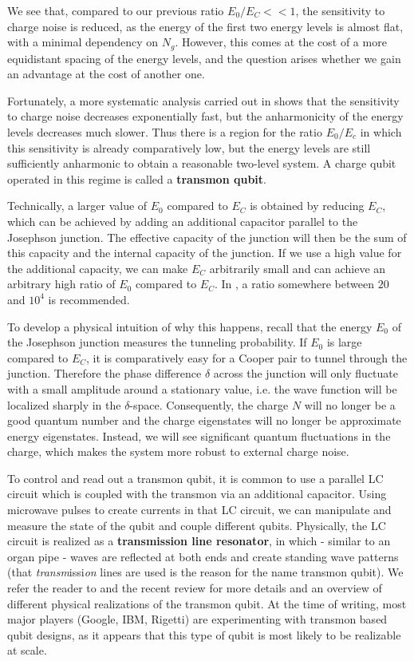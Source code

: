 \documentclass[a4paper, draft]{article}
\theoremstyle{own}
\theoremstyle{remark}
\begin{document}
We see that, compared to our previous ratio $E_0 / E_C << 1$, the sensitivity to charge noise is reduced, as the energy of the first two energy levels is almost flat, with a minimal dependency on $N_g$. However, this comes at the cost of a more equidistant spacing of the energy levels, and the question arises whether we gain an advantage at the cost of another one.

Fortunately, a more systematic analysis carried out in \cite{KochEtAl} shows that the sensitivity to charge noise decreases exponentially fast, but the anharmonicity of the energy levels decreases much slower. Thus there is a region for the ratio $E_0 / E_c$ in which this sensitivity is already comparatively low, but the energy levels are still sufficiently anharmonic to obtain a reasonable two-level system. A charge qubit operated in this regime is called a {\bf transmon qubit}.

Technically, a larger value of $E_0$ compared to $E_C$ is obtained by reducing $E_C$, which can be achieved by adding an additional capacitor parallel to the Josephson junction. The effective capacity of the junction will then be the sum of this capacity and the internal capacity of the junction. If we use a high value for the additional capacity, we can make $E_C$ arbitrarily small and can achieve an arbitrary high ratio of $E_0$ compared to $E_C$. In \cite{KochEtAl}, a ratio somewhere between $20$ and $10^4$ is recommended.

To develop a physical intuition of why this happens, recall that the energy $E_0$ of the Josephson junction measures the tunneling probability. If $E_0$ is large compared to $E_C$, it is comparatively easy for a Cooper pair to tunnel through the junction. Therefore the phase difference $\delta$ across the junction will only fluctuate with a small amplitude around a stationary value, i.e. the wave function will be localized sharply in the $\delta$-space. Consequently, the charge $N$ will no longer be a good quantum number and the charge eigenstates will no longer be approximate energy eigenstates. Instead, we will see significant quantum fluctuations in the charge, which makes the system more robust to external charge noise. 

To control and read out a transmon qubit, it is common to use a parallel LC circuit which is coupled with the transmon via an additional capacitor. Using microwave pulses to create currents in that LC circuit, we can manipulate and measure the state of the qubit and couple different qubits. Physically, the LC circuit is realized as a {\bf transmission line resonator}, in which - similar to an organ pipe - waves are reflected at both ends and create standing wave patterns (that {\it transm}issi{\it on} lines are used is the reason for the name transmon qubit). We refer the reader to \cite{KochEtAl} and the recent review \cite{Wendin2016} for more details and an overview of different physical realizations of the transmon qubit. At the time of writing, most major players (Google, IBM, Rigetti) are experimenting with transmon based qubit designs, as it appears that this type of qubit is most likely to be realizable at scale.
\end{document}
